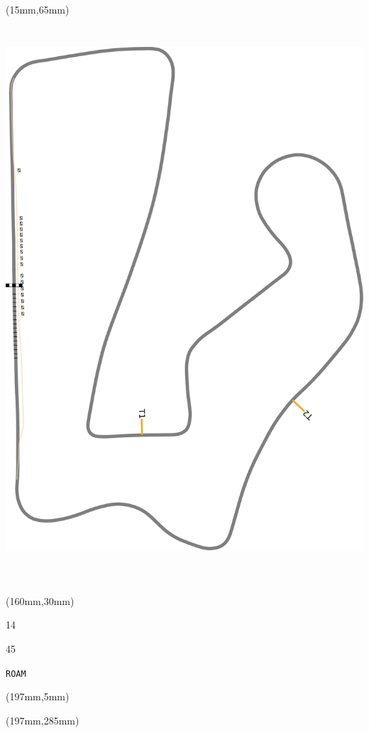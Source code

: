 \begin{textblock*}{185mm}(15mm,65mm)%
\centering
\mbox{\includegraphics[width=185mm,height=210mm,keepaspectratio]{PT/ROAM.pdf}}
\end{textblock*}
\begin{textblock*}{40mm}(160mm,30mm)%
\Large
\par{} 
\par14 
\par45 
\par\hfill\tiny\tt ROAM\\
\end{textblock*}
\begin{textblock*}{20mm}(197mm,5mm)%
\fbox{\thepage}
\label{ROAM}
\end{textblock*}
\begin{textblock*}{20mm}(197mm,285mm)%
\fbox{\thepage}
\end{textblock*}

